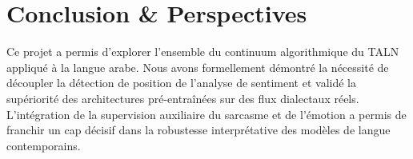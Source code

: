 \documentclass[11pt,a4paper]{article}
\begin{document}
\section{Conclusion \& Perspectives}
Ce projet a permis d'explorer l'ensemble du continuum algorithmique du TALN appliqué à la langue arabe. Nous avons formellement démontré la nécessité de découpler la détection de position de l'analyse de sentiment et validé la supériorité des architectures pré-entraînées sur des flux dialectaux réels. L'intégration de la supervision auxiliaire du sarcasme et de l'émotion a permis de franchir un cap décisif dans la robustesse interprétative des modèles de langue contemporains.
\end{document}
